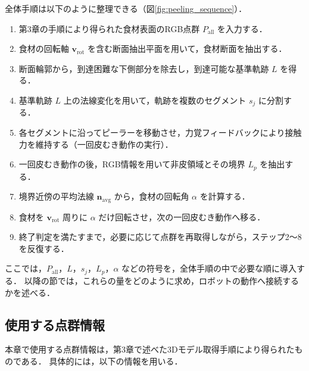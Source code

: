 全体手順は以下のように整理できる（図\ref{fig:peeling_sequence}）．

\begin{enumerate}
  \item 第3章の手順により得られた食材表面のRGB点群 $P_{\mathrm{all}}$ を入力する．
  \item 食材の回転軸 $\mathbf{v}_{\mathrm{rot}}$ を含む断面抽出平面を用いて，食材断面を抽出する．
  \item 断面輪郭から，到達困難な下側部分を除去し，到達可能な基準軌跡 $L$ を得る．
  \item 基準軌跡 $L$ 上の法線変化を用いて，軌跡を複数のセグメント $s_j$ に分割する．
  \item 各セグメントに沿ってピーラーを移動させ，力覚フィードバックにより接触力を維持する（一回皮むき動作の実行）．
  \item 一回皮むき動作の後，RGB情報を用いて非皮領域とその境界 $L_p$ を抽出する．
  \item 境界近傍の平均法線 $\mathbf{n}_{\mathrm{avg}}$ から，食材の回転角 $\alpha$ を計算する．
  \item 食材を $\mathbf{v}_{\mathrm{rot}}$ 周りに $\alpha$ だけ回転させ，次の一回皮むき動作へ移る．
  \item 終了判定を満たすまで，必要に応じて点群を再取得しながら，ステップ2〜8を反復する．
\end{enumerate}


ここでは，$P_{\mathrm{all}}$，$L$，$s_j$，$L_p$，$\alpha$ などの符号を，全体手順の中で必要な順に導入する．
以降の節では，これらの量をどのように求め，ロボットの動作へ接続するかを述べる．

\subsection{使用する点群情報}

本章で使用する点群情報は，第3章で述べた3Dモデル取得手順により得られたものである．
具体的には，以下の情報を用いる．

